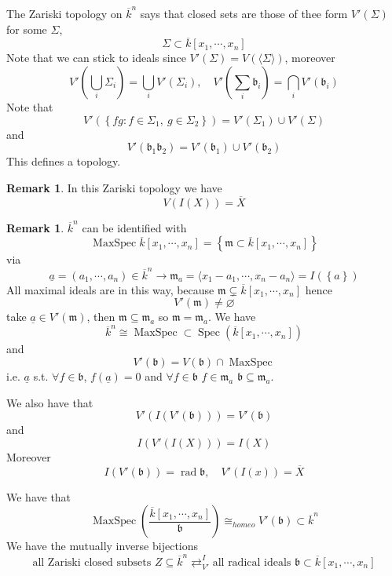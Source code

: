 \documentclass[11pt,a4paper]{article}
\theoremstyle{definition}
\newtheorem{remark}[definition]{Remark}
\theoremstyle{plain}
\theoremstyle{remark}
\renewcommand{\set}[1]{\left\{ #1 \right\}}
\newcommand{\angles}[1]{\langle #1 \rangle}
\newcommand{\Spec}{\operatorname{Spec}}
\newcommand{\rad}{\operatorname{rad}}
\begin{document}
The Zariski topology on $\overline{k}^n$ says that closed sets are those of thee form $V'(\Sigma)$ for some $\Sigma$, 
$$\Sigma \subset \overline{k}[x_1, \cdots, x_n]$$
Note that we can stick to ideals since $V'(\Sigma) = V(\angles{\Sigma})$, moreover 
$$V'(\bigcup_i \Sigma_i) =  \bigcup_{i} V'(\Sigma_i), \quad V'(\sum_i \mathfrak{b}_i) = \bigcap_i V'(\mathfrak{b}_i)$$
Note that 
$$V'(\set{fg \colon f \in \Sigma_1, \ g \in \Sigma_2}) = V'(\Sigma_1) \cup V'(\Sigma)$$
and 
$$V'(\mathfrak{b}_1 \mathfrak{b}_2) = V'(\mathfrak{b}_1) \cup V'(\mathfrak{b}_2)$$
This defines a topology. 

\begin{remark}
    In this Zariski topology we have 
    $$V(I(X)) = \overline{X}$$
\end{remark}

\begin{remark}
    $\overline{k}^n$ can be identified with 
    $$\operatorname{MaxSpec} \overline{k}[x_1, \cdots, x_n] = \set{\mathfrak{m} \subset \overline{k}[x_1, \cdots, x_n]}$$
    via 
    $$\underline{a} = (a_1, \cdots, a_n) \in \overline{k}^n \to \mathfrak{m}_a = \angles{x_1-a_1, \cdots, x_n-a_n} = I(\set{a})$$
    All maximal ideals are in this way, because $\mathfrak{m} \subsetneq \overline{k}[x_1, \cdots, x_n]$ hence 
    $$V'(\mathfrak{m}) \ne \varnothing$$
    take $\underline{a} \in V'(\mathfrak{m})$, then $\mathfrak{m} \subseteq \mathfrak{m}_a$ so $\mathfrak{m} = \mathfrak{m}_a$. 
    We have 
    $$\overline{k}^n \cong \operatorname{MaxSpec} \subset \Spec (\overline{k}[x_1, \cdots, x_n])$$
    and 
    $$V'(\mathfrak{b}) = V(\mathfrak{b}) \cap \operatorname{MaxSpec}$$
    i.e. $\underline{a}$ s.t. $\forall f \in \mathfrak{b}$, $f(\underline{a}) = 0$ and $\forall f \in \mathfrak{b}$ 
    $f \in \mathfrak{m}_a$ $\mathfrak{b} \subseteq \mathfrak{m}_a$. 

    We also have that 
    $$V'(I(V'(\mathfrak{b}))) = V'(\mathfrak{b})$$
    and 
    $$I(V'(I(X))) = I(X)$$
    Moreover 
    $$I(V'(\mathfrak{b}))  = \rad \mathfrak{b}, \quad V'(I(x)) = \overline{X}$$
\end{remark}

We have that 
$$\operatorname{MaxSpec} (\frac{\overline{k}[x_1, \cdots, x_n]}{\mathfrak{b}}) \cong_{homeo} V'(\mathfrak{b}) \subset \overline{k}^n$$
We have the mutually inverse bijections
$$\text{all Zariski closed subsets $Z \subseteq \overline{k}^n$} \rightleftarrows^I_{V'} \text{all radical ideals $\mathfrak{b} \subset \overline{k}[x_1, \cdots, x_n]$}$$
\end{document}
